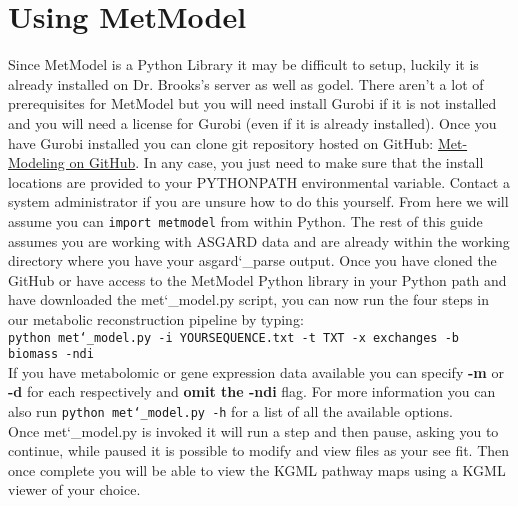 \section{Using MetModel}
\indent\indent Since MetModel is a Python Library it may be difficult to setup, luckily it is already installed on Dr. Brooks's server as well as godel. There aren't a lot of prerequisites for MetModel but you will need install Gurobi if it is not installed and you will need a license for Gurobi (even if it is already installed). Once you have Gurobi installed you can clone git repository hosted on GitHub: \href{https://github.com/metabolic-reconstruction/met-modeling}{Met-Modeling on GitHub}.  In any case, you just need to make sure that the install locations are provided to your PYTHONPATH environmental variable. Contact a system administrator if you are unsure how to do this yourself.  From here we will assume you can \texttt{import metmodel} from within Python. The rest of this guide assumes you are working with ASGARD data and are already within the working directory where you have your asgard\char`_parse output. Once you have cloned the GitHub or have access to the MetModel Python library in your Python path and have downloaded the met\char`_model.py script, you can now run the four steps in our metabolic reconstruction pipeline by typing:\\ 
%
%
\texttt{python met\char`_model.py -i YOURSEQUENCE.txt -t TXT -x exchanges -b biomass -ndi } \\ If you have metabolomic or gene expression data available you can specify \textbf{-m} or \textbf{-d} for each respectively and \textbf{omit the -ndi} flag. For more information you can also run \texttt{python met\char`_model.py -h} for a list of all the available options.\\
\indent Once met\char`_model.py is invoked it will run a step and then pause, asking you to continue, while paused it is possible to modify and view files as your see fit.  Then once complete you will be able to view the KGML pathway maps using a KGML viewer of your choice.